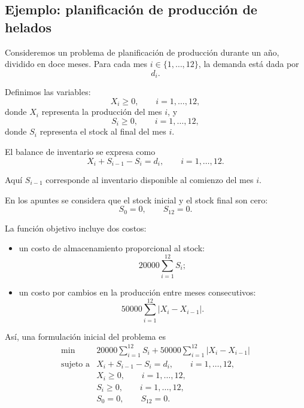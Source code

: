 \subsection{Ejemplo: planificación de producción de helados}

Consideremos un problema de planificación de producción durante un año, dividido en doce meses. Para cada mes \(i\in\{1,\dots,12\}\), la demanda está dada por
\[
    d_i.
\]

Definimos las variables:
\[
    X_i\geq 0,
    \qquad i=1,\dots,12,
\]
donde \(X_i\) representa la producción del mes \(i\), y
\[
    S_i\geq 0,
    \qquad i=1,\dots,12,
\]
donde \(S_i\) representa el stock al final del mes \(i\).

El balance de inventario se expresa como
\[
    X_i+S_{i-1}-S_i=d_i,
    \qquad i=1,\dots,12.
\]

Aquí \(S_{i-1}\) corresponde al inventario disponible al comienzo del mes \(i\).

En los apuntes se considera que el stock inicial y el stock final son cero:
\[
    S_0=0,
    \qquad
    S_{12}=0.
\]

La función objetivo incluye dos costos:
\begin{itemize}
    \item un costo de almacenamiento proporcional al stock:
    \[
        20000\sum_{i=1}^{12}S_i;
    \]
    \item un costo por cambios en la producción entre meses consecutivos:
    \[
        50000\sum_{i=1}^{12}|X_i-X_{i-1}|.
    \]
\end{itemize}


Así, una formulación inicial del problema es
\[
    \begin{array}{ll}
        \min
        &
        20000\displaystyle\sum_{i=1}^{12}S_i
        +
        50000\displaystyle\sum_{i=1}^{12}|X_i-X_{i-1}|
        \\[3mm]
        \text{sujeto a}
        &
        X_i+S_{i-1}-S_i=d_i,
        \qquad i=1,\dots,12,\\[1mm]
        &
        X_i\geq 0,
        \qquad i=1,\dots,12,\\[1mm]
        &
        S_i\geq 0,
        \qquad i=1,\dots,12,\\[1mm]
        &
        S_0=0,\qquad S_{12}=0.
    \end{array}
\]

